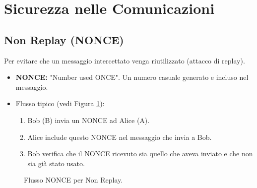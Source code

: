 \documentclass{article}
\begin{document}
\section{Sicurezza nelle Comunicazioni}

\subsection{Non Replay (NONCE)}
Per evitare che un messaggio intercettato venga riutilizzato (attacco di replay).
\begin{itemize}
    \item \textbf{NONCE:} "Number used ONCE". Un numero casuale generato e incluso nel messaggio.
    \item Flusso tipico (vedi Figura \ref{fig:nonce_flow}):
    \begin{enumerate}
        \item Bob (B) invia un NONCE ad Alice (A).
        \item Alice include questo NONCE nel messaggio che invia a Bob.
        \item Bob verifica che il NONCE ricevuto sia quello che aveva inviato e che non sia già stato usato.
    \end{enumerate}
\end{itemize}

\begin{figure}[H]
\centering
{}
\caption{Flusso NONCE per Non Replay.}
\label{fig:nonce_flow}
\end{figure}
\end{document}
